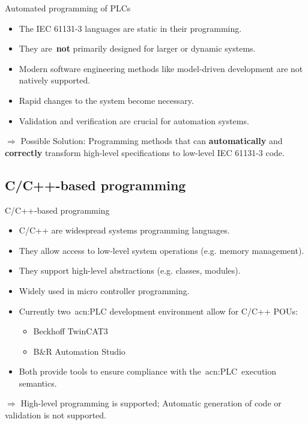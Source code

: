 \documentclass[18pt]{beamer}
\begin{document}
\begin{frame}{Automated programming of PLCs}
\begin{itemize}
    \item The IEC 61131-3 languages are static in their programming.
    \item They are~\textbf{not} primarily designed for larger or dynamic systems.
    \item Modern software engineering methods like model-driven development are not natively supported.
    \item Rapid changes to the system become necessary.
    \item Validation and verification are crucial for automation systems.
\end{itemize}
$\Rightarrow$ Possible Solution: Programming methods that can \textbf{automatically} and \textbf{correctly} transform high-level specifications to low-level IEC 61131-3 code.
\end{frame}

\subsection{C/C++-based programming}

\begin{frame}{C/C++-based programming}
\begin{itemize}
	\item C/C++ are widespread systems programming languages.
    \item They allow access to low-level system operations (e.g. memory management).
    \item They support high-level abstractions (e.g. classes, modules).
	\item Widely used in micro controller programming.
    \item Currently two~\acrshort{acn:PLC} development environment allow for C/C++ POUs:
    \begin{itemize}
        \item Beckhoff TwinCAT3 
        \item B\&R Automation Studio
    \end{itemize}
    \item Both provide tools to ensure compliance with the~\acrshort{acn:PLC} execution semantics.
\end{itemize}
$\Rightarrow$ High-level programming is supported; Automatic generation of code or validation is not supported.
\end{frame}
\end{document}
